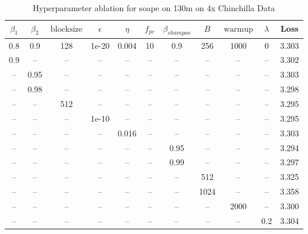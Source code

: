 \begin{table}[h!]
\centering
\caption{Hyperparameter ablation for soape on 130m on 4x Chinchilla Data}
\label{tab:ablation_soape_130m_on_4x_chinchilla_data}
\begin{tabular}{ccccccccccc}
\toprule
$\beta_1$ & $\beta_2$ & $\mathrm{block size}$ & $\epsilon$ & $\eta$ & $f_{pc}$ & $\beta_{shampoo}$ & $B$ & $\mathrm{warmup}$ & $\lambda$ & Loss \\
\midrule
0.8 & 0.9 & 128 & 1e-20 & 0.004 & 10 & 0.9 & 256 & 1000 & 0 & 3.303 \\
\midrule
0.9 & -- & -- & -- & -- & -- & -- & -- & -- & -- & 3.302 \\
-- & 0.95 & -- & -- & -- & -- & -- & -- & -- & -- & 3.303 \\
-- & 0.98 & -- & -- & -- & -- & -- & -- & -- & -- & 3.298 \\
-- & -- & 512 & -- & -- & -- & -- & -- & -- & -- & 3.295 \\
-- & -- & -- & 1e-10 & -- & -- & -- & -- & -- & -- & 3.295 \\
-- & -- & -- & -- & 0.016 & -- & -- & -- & -- & -- & 3.303 \\
-- & -- & -- & -- & -- & -- & 0.95 & -- & -- & -- & 3.294 \\
-- & -- & -- & -- & -- & -- & 0.99 & -- & -- & -- & 3.297 \\
-- & -- & -- & -- & -- & -- & -- & 512 & -- & -- & 3.325 \\
-- & -- & -- & -- & -- & -- & -- & 1024 & -- & -- & 3.358 \\
-- & -- & -- & -- & -- & -- & -- & -- & 2000 & -- & 3.300 \\
-- & -- & -- & -- & -- & -- & -- & -- & -- & 0.2 & 3.304 \\
\bottomrule
\end{tabular}
\end{table}

